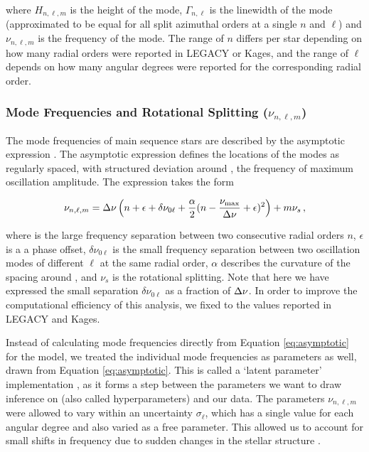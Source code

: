 \noindent where $H_{n,\ell,m}$ is the height of the mode, $\Gamma_{n,\ell}$ is the linewidth of the mode (approximated to be equal for all split azimuthal orders at a single $n$ and $\ell$) and $\nu_{n, \ell, m}$ is the frequency of the mode. The range of $n$ differs per star depending on how many radial orders were reported in LEGACY or Kages, and the range of $\ell$ depends on how many angular degrees were reported for the corresponding radial order.

\subsubsection{Mode Frequencies and Rotational Splitting ($\nu_{n,\ell,m}$)}\label{ssec:frequencies}
The mode frequencies of main sequence stars are described by the asymptotic expression \cite{tassoul1980, vrard+2016}. The asymptotic expression defines the locations of the modes as regularly spaced, with structured deviation around \numax, the frequency of maximum oscillation amplitude. The expression takes the form

\begin{equation}\label{eq:asymptotic}
	\nu_{n,\ell,m} = \mbox{$\Delta \nu$}\left(n + \epsilon + \delta\nu_{0\ell} + \frac{\alpha}{2}(n - \frac{\mbox{$\nu_{\rm max}$}}{\mbox{$\Delta \nu$}} + \epsilon)^2\right) + m\nu_{s}\, ,
\end{equation}

\noindent where \dnu is the large frequency separation between two consecutive radial orders $n$, $\epsilon$ is a a phase offset, $\delta\nu_{0\ell}$ is the small frequency separation between two oscillation modes of different $\ell$ at the same radial order, $\alpha$ describes the curvature of the spacing around \numax, and $\nu_s$ is the rotational splitting. Note that here we have expressed the small separation $\delta\nu_{0\ell}$ as a fraction of $\mbox{$\Delta \nu$}$. In order to improve the computational efficiency of this analysis, we fixed \dnu to the values reported in LEGACY and Kages.

Instead of calculating mode frequencies directly from Equation \ref{eq:asymptotic} for the model, we treated the individual mode frequencies as parameters as well, drawn from Equation \ref{eq:asymptotic}. This is called a `latent parameter' implementation \cite{hogg2012, hall+2019}, as it forms a step between the parameters we want to draw inference on (also called hyperparameters) and our data. 
The parameters $\nu_{n,\ell,m}$ were allowed to vary within an uncertainty $\sigma_{\ell}$, which has a single value for each angular degree and also varied as a free parameter.
This allowed us to account for small shifts in frequency due to sudden changes in the stellar structure \cite{mazumdar+2014}. 

